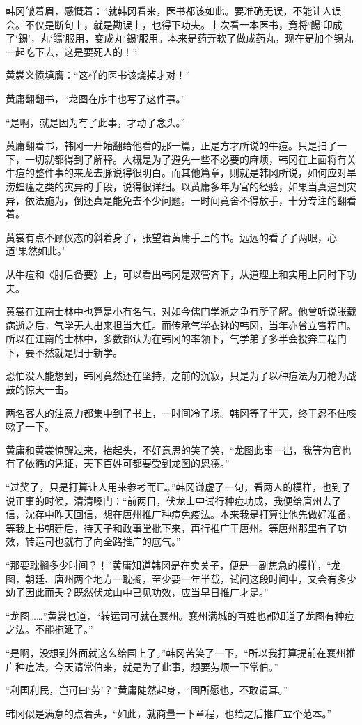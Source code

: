 韩冈皱着眉，感慨着：“就韩冈看来，医书都该如此。要准确无误，不能让人误会。不仅是断句上，就是勘误上，也得下功夫。上次看一本医书，竟将‘餳’印成了‘錫’，丸‘餳’服用，变成丸‘錫’服用。本来是药弄软了做成药丸，现在是加个锡丸一起吃下去，这是要死人的！”

黄裳义愤填膺：“这样的医书该烧掉才对！”

黄庸翻翻书，“龙图在序中也写了这件事。”

“是啊，就是因为有了此事，才动了念头。”

黄庸翻着书，韩冈一开始翻给他看的那一篇，正是方才所说的牛痘。只是扫了一下，一切就都得到了解释。大概是为了避免一些不必要的麻烦，韩冈在上面将有关牛痘的整件事的来龙去脉说得很明白。而其他篇章，则就是韩冈所说，如何应对旱涝蝗瘟之类的灾异的手段，说得很详细。以黄庸多年为官的经验，如果当真遇到灾异，依法施为，倒还真是能免去不少问题。一时间竟舍不得放手，十分专注的翻看着。

黄裳有点不顾仪态的斜着身子，张望着黄庸手上的书。远远的看了了两眼，心道‘果然如此。’

从牛痘和《肘后备要》上，可以看出韩冈是双管齐下，从道理上和实用上同时下功夫。

黄裳在江南士林中也算是小有名气，对如今儒门学派之争有所了解。他曾听说张载病逝之后，气学无人出来担当大任。而传承气学衣钵的韩冈，当年亦曾立雪程门。所以在江南的士林中，多数都认为在韩冈的率领下，气学弟子多半会投奔二程门下，要不然就是归于新学。

恐怕没人能想到，韩冈竟然还在坚持，之前的沉寂，只是为了以种痘法为刀枪为战鼓的惊天一击。

两名客人的注意力都集中到了书上，一时间冷了场。韩冈等了半天，终于忍不住咳嗽了一下。

黄庸和黄裳惊醒过来，抬起头，不好意思的笑了笑，“龙图此事一出，我等为官也有了依循的凭证，天下百姓可都要受到龙图的恩德。”

“过奖了，只是打算让人用来参考而已。”韩冈谦虚了一句，看两人的模样，也到了说正事的时候，清清嗓门：“前两日，伏龙山中试行种痘功成，我便给唐州去了信，沈存中昨天回信，想在唐州推广种痘免疫法。本来我是打算让他先做好准备，等我上书朝廷后，待天子和政事堂批下来，再行推广于唐州。等唐州那里有了功效，转运司也就有了向全路推广的底气。”

“那要耽搁多少时间？！”黄庸知道韩冈是在卖关子，便是一副焦急的模样，“龙图，朝廷、唐州两个地方一耽搁，至少要一年半载，试问这段时间中，又会有多少幼子因此而夭？既然伏龙山中已见功效，应当早日推广才是。”

“龙图……”黄裳也道，“转运司可就在襄州。襄州满城的百姓也都知道了龙图有种痘之法。不能拖延了。”

“是啊，没想到外面就这么给围上了。”韩冈苦笑了一下，“所以我打算提前在襄州推广种痘法，今天请常伯来，就是为了此事，想要劳烦一下常伯。”

“利国利民，岂可曰‘劳’？”黄庸陡然起身，“固所愿也，不敢请耳。”

韩冈似是满意的点着头，“如此，就商量一下章程，也给之后推广立个范本。”

